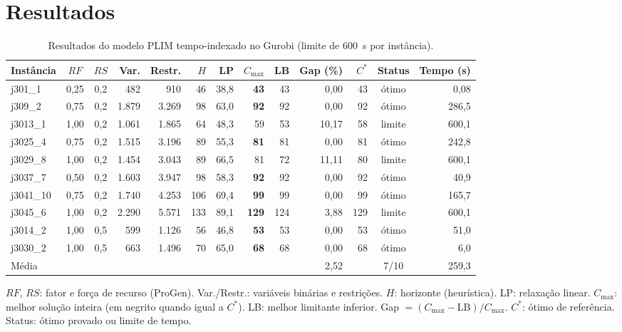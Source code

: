 \documentclass[11pt,a4paper]{article}
\newcommand{\cmax}{C_{\max}}
\begin{document}
\section*{Resultados}

\begin{table}[ht]
\centering
\small
\setlength{\tabcolsep}{4.2pt}
\caption{Resultados do modelo PLIM tempo-indexado no Gurobi (limite de 600~s por instância).}
\label{tab:exato}
\begin{tabular}{lccrrrrrrrrcr}
\toprule
Instância & $RF$ & $RS$ & Var. & Restr. & $H$ & LP & $\cmax$ & LB & Gap (\%) & $C^*$ & Status & Tempo (s) \\
\midrule
j301\_1 & 0,25 & 0,2 & 482 & 910 & 46 & 38,8 & \textbf{43} & 43 & 0,00 & 43 & ótimo & 0,08 \\
j309\_2 & 0,75 & 0,2 & 1.879 & 3.269 & 98 & 63,0 & \textbf{92} & 92 & 0,00 & 92 & ótimo & 286,5 \\
j3013\_1 & 1,00 & 0,2 & 1.061 & 1.865 & 64 & 48,3 & 59 & 53 & 10,17 & 58 & limite & 600,1 \\
j3025\_4 & 0,75 & 0,2 & 1.515 & 3.196 & 89 & 55,3 & \textbf{81} & 81 & 0,00 & 81 & ótimo & 242,8 \\
j3029\_8 & 1,00 & 0,2 & 1.454 & 3.043 & 89 & 66,5 & 81 & 72 & 11,11 & 80 & limite & 600,1 \\
j3037\_7 & 0,50 & 0,2 & 1.603 & 3.947 & 98 & 58,3 & \textbf{92} & 92 & 0,00 & 92 & ótimo & 40,9 \\
j3041\_10 & 0,75 & 0,2 & 1.740 & 4.253 & 106 & 69,4 & \textbf{99} & 99 & 0,00 & 99 & ótimo & 165,7 \\
j3045\_6 & 1,00 & 0,2 & 2.290 & 5.571 & 133 & 89,1 & \textbf{129} & 124 & 3,88 & 129 & limite & 600,1 \\
j3014\_2 & 1,00 & 0,5 & 599 & 1.126 & 56 & 46,8 & \textbf{53} & 53 & 0,00 & 53 & ótimo & 51,0 \\
j3030\_2 & 1,00 & 0,5 & 663 & 1.496 & 70 & 65,0 & \textbf{68} & 68 & 0,00 & 68 & ótimo & 6,0 \\
\midrule
Média & & & & & & & & & 2,52 & & 7/10 & 259,3 \\
\bottomrule
\end{tabular}
\par\smallskip
\begin{minipage}{0.97\textwidth}\footnotesize
$RF$, $RS$: fator e força de recurso (ProGen). Var./Restr.: variáveis binárias e restrições. $H$: horizonte (heurística). LP: relaxação linear.
$\cmax$: melhor solução inteira (em negrito quando igual a $C^*$). LB: melhor limitante inferior.
Gap $= (\cmax - \text{LB})/\cmax$. $C^*$: ótimo de referência. Status: ótimo provado ou limite de tempo.
\end{minipage}
\end{table}
\end{document}
